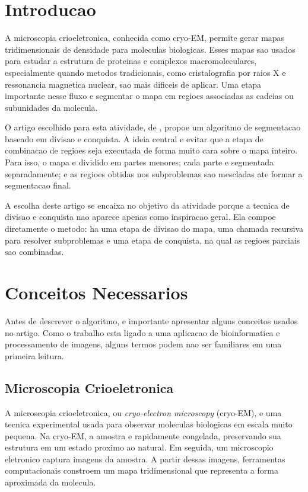 \documentclass[tcc1]{uftex}
\begin{document}
\tableofcontents

\mainmatter

\chapter{Introducao}

A microscopia crioeletronica, conhecida como cryo-EM, permite gerar mapas tridimensionais de densidade para moleculas biologicas. Esses mapas sao usados para estudar a estrutura de proteinas e complexos macromoleculares, especialmente quando metodos tradicionais, como cristalografia por raios X e ressonancia magnetica nuclear, sao mais dificeis de aplicar. Uma etapa importante nesse fluxo e segmentar o mapa em regioes associadas as cadeias ou subunidades da molecula.

O artigo escolhido para esta atividade, de , propoe um algoritmo de segmentacao baseado em divisao e conquista. A ideia central e evitar que a etapa de combinacao de regioes seja executada de forma muito cara sobre o mapa inteiro. Para isso, o mapa e dividido em partes menores; cada parte e segmentada separadamente; e as regioes obtidas nos subproblemas sao mescladas ate formar a segmentacao final.

A escolha deste artigo se encaixa no objetivo da atividade porque a tecnica de divisao e conquista nao aparece apenas como inspiracao geral. Ela compoe diretamente o metodo: ha uma etapa de divisao do mapa, uma chamada recursiva para resolver subproblemas e uma etapa de conquista, na qual as regioes parciais sao combinadas.

\chapter{Conceitos Necessarios}

Antes de descrever o algoritmo, e importante apresentar alguns conceitos usados no artigo. Como o trabalho esta ligado a uma aplicacao de bioinformatica e processamento de imagens, alguns termos podem nao ser familiares em uma primeira leitura.

\section{Microscopia Crioeletronica}

A microscopia crioeletronica, ou \textit{cryo-electron microscopy} (cryo-EM), e uma tecnica experimental usada para observar moleculas biologicas em escala muito pequena. Na cryo-EM, a amostra e rapidamente congelada, preservando sua estrutura em um estado proximo ao natural. Em seguida, um microscopio eletronico captura imagens da amostra. A partir dessas imagens, ferramentas computacionais constroem um mapa tridimensional que representa a forma aproximada da molecula.
\end{document}
